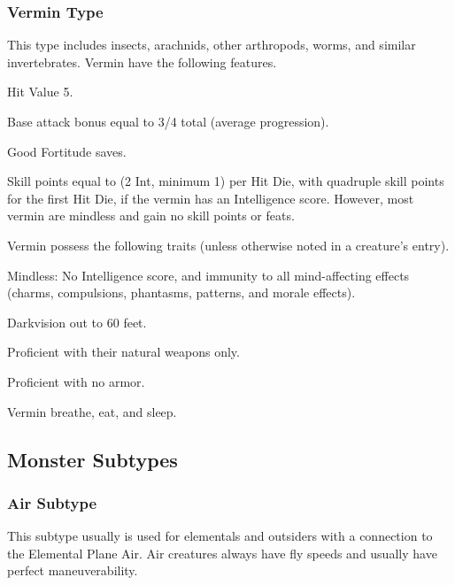 {\subsubsection{Vermin Type} This type includes insects, arachnids, other arthropods, worms, and similar invertebrates.
 Vermin have the following features.
\begin{itemize*}
\item Hit Value 5.
\item Base attack bonus equal to 3/4 total  (average progression).
\item Good Fortitude saves.
\item Skill points equal to (2 \add Int, minimum 1) per Hit Die, with quadruple skill points for the first Hit Die, if the vermin has an Intelligence score. However, most vermin are mindless and gain no skill points or feats.
\end{itemize*}
 Vermin possess the following traits (unless otherwise noted in a creature's entry).
\begin{itemize*}
\item Mindless: No Intelligence score, and immunity to all mind-affecting effects (charms, compulsions, phantasms, patterns, and morale effects).
\item Darkvision out to 60 feet.
\item Proficient with their natural weapons only.
\item Proficient with no armor.
\item Vermin breathe, eat, and sleep.
\end{itemize*}

\subsection{Monster Subtypes}

\subsubsection{Air Subtype} This subtype usually is used for elementals and outsiders with a connection to the Elemental Plane Air. Air creatures always have fly speeds and usually have perfect maneuverability.

}
